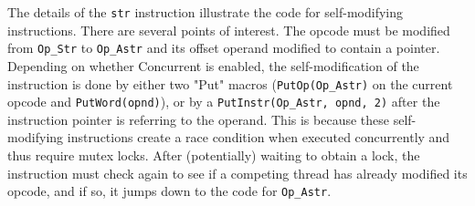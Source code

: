 The details of the \texttt{str} instruction illustrate the code for
self-modifying instructions. There are several points of interest. The
opcode must be modified from \texttt{Op\_Str} to \texttt{Op\_Astr} and
its offset operand modified to contain a pointer.  Depending on
whether Concurrent is enabled, the self-modification of the
instruction is done by either two "Put" macros
(\texttt{PutOp(Op\_Astr)} on the current opcode and
\texttt{PutWord(opnd)}), or by a \texttt{PutInstr(Op\_Astr, opnd, 2)}
after the instruction pointer is referring to the operand.  This is
because these self-modifying instructions create a race condition when
executed concurrently and thus require mutex locks.  After
(potentially) waiting to obtain a lock, the instruction must check
again to see if a competing thread has already modified its opcode,
and if so, it jumps down to the code for \texttt{Op\_Astr}.




